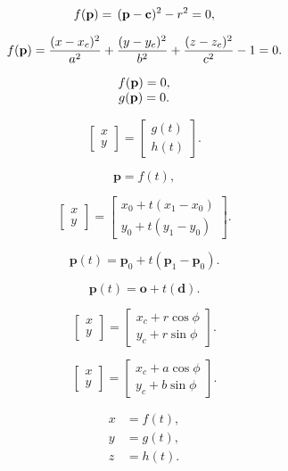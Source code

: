 \[
  f({\bf p})=\,({\bf p}-{\bf c})^{2}-r^{2}=0,
\]

\[
  f({\bf p})=\frac{(x-x_{c})^{2}}{a^{2}}+\frac{(y-y_{c})^{2}}{b^{2}}+\frac{(z-z_{c})^{2}}{c^{2}}-1=0.
\]

\[
  \begin{array}{c l c r}{{f({\bf p})=0,}}\\ {{g({\bf p})=0.}}\end{array}
\]

\[
  \begin{bmatrix}
    x \\
    y
  \end{bmatrix}=
  \begin{bmatrix}
    g(t) \\
    h(t)
  \end{bmatrix}.
\]

\[
  \mathbf{p}=f(t),
\]

\[
  \begin{bmatrix}
    x \\
    y
  \end{bmatrix}=
  \begin{bmatrix}
    x_0+t(x_1-x_0) \\
    y_0+t(y_1-y_0)
  \end{bmatrix}.
\]

\[
  \mathbf{p}(t)=\mathbf{p}_{0}+t(\mathbf{p}_{1}-\mathbf{p}_{0}).
\]

\[
  \mathbf{p}(t)=\mathbf{o}+t(\mathbf{d}).
\]

\[
  \begin{bmatrix}
    x \\
    y
  \end{bmatrix}=
  \begin{bmatrix}
    x_c+r\cos\phi \\
    y_c+r\sin\phi
  \end{bmatrix}.
\]

\[
  \begin{bmatrix}
    x \\
    y
  \end{bmatrix}=
  \begin{bmatrix}
    x_c+a\cos\phi \\
    y_c+b\sin\phi
  \end{bmatrix}.
\]

\[
  \begin{aligned}
    x & =f(t), \\
    y & =g(t), \\
    z & =h(t).
  \end{aligned}
\]

